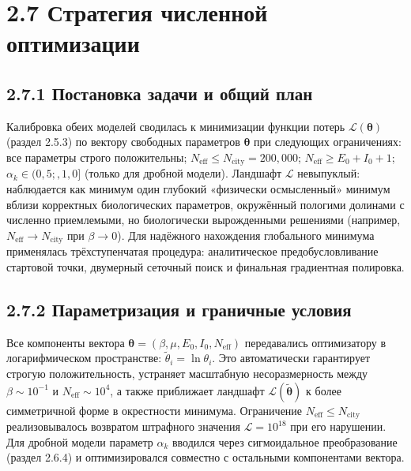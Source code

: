\documentclass[12pt]{article}
\begin{document}
\section{2.7 Стратегия численной
оптимизации}\label{ux441ux442ux440ux430ux442ux435ux433ux438ux44f-ux447ux438ux441ux43bux435ux43dux43dux43eux439-ux43eux43fux442ux438ux43cux438ux437ux430ux446ux438ux438}

\subsection{2.7.1 Постановка задачи и общий
план}\label{ux43fux43eux441ux442ux430ux43dux43eux432ux43aux430-ux437ux430ux434ux430ux447ux438-ux438-ux43eux431ux449ux438ux439-ux43fux43bux430ux43d}

Калибровка обеих моделей сводилась к минимизации функции потерь
\(\mathcal{L}(\boldsymbol{\theta})\) (раздел 2.5.3) по вектору свободных
параметров \(\boldsymbol{\theta}\) при следующих ограничениях: все
параметры строго положительны;
\(N_{\text{eff}} \leq N_{\text{city}} = 200,000\);
\(N_{\text{eff}} \geq E_0 + I_0 + 1\); \(\alpha_k \in (0{,}5;,1{,}0]\)
(только для дробной модели). Ландшафт \(\mathcal{L}\) невыпуклый:
наблюдается как минимум один глубокий «физически осмысленный» минимум
вблизи корректных биологических параметров, окружённый пологими долинами
с численно приемлемыми, но биологически вырожденными решениями
(например, \(N_{\text{eff}} \to N_{\text{city}}\) при \(\beta \to 0\)).
Для надёжного нахождения глобального минимума применялась
трёхступенчатая процедура: аналитическое предобусловливание стартовой
точки, двумерный сеточный поиск и финальная градиентная полировка.

\subsection{2.7.2 Параметризация и граничные
условия}\label{ux43fux430ux440ux430ux43cux435ux442ux440ux438ux437ux430ux446ux438ux44f-ux438-ux433ux440ux430ux43dux438ux447ux43dux44bux435-ux443ux441ux43bux43eux432ux438ux44f}

Все компоненты вектора
\(\boldsymbol{\theta} = (\beta, \mu, E_0, I_0, N_{\text{eff}})\)
передавались оптимизатору в логарифмическом пространстве:
\(\tilde{\theta}_i = \ln \theta_i\). Это автоматически гарантирует
строгую положительность, устраняет масштабную несоразмерность между
\(\beta \sim 10^{-1}\) и \(N_{\text{eff}} \sim 10^{4}\), а также
приближает ландшафт \(\mathcal{L}(\tilde{\boldsymbol{\theta}})\) к более
симметричной форме в окрестности минимума. Ограничение
\(N_{\text{eff}} \leq N_{\text{city}}\) реализовывалось возвратом
штрафного значения \(\mathcal{L} = 10^{18}\) при его нарушении. Для
дробной модели параметр \(\alpha_k\) вводился через сигмоидальное
преобразование (раздел 2.6.4) и оптимизировался совместно с остальными
компонентами вектора.
\end{document}

